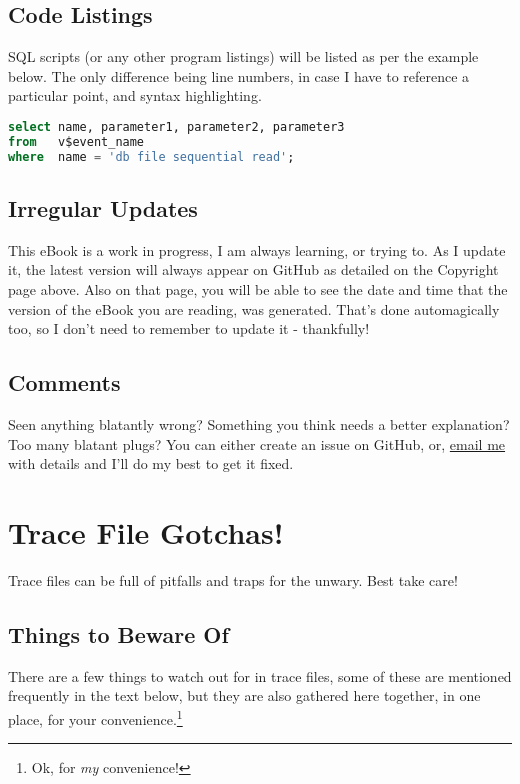 \section*{Code Listings}

SQL scripts (or any other program listings) will be listed as per the example below. The only difference being line numbers, in case I have to reference a particular point, and syntax highlighting.

\begin{lstlisting}[language=SQL]
select name, parameter1, parameter2, parameter3
from   v$event_name
where  name = 'db file sequential read';
\end{lstlisting}

\section*{Irregular Updates}

This eBook is a work in progress, I am always learning, or trying to. As I update it, the latest version will always appear on GitHub as detailed on the Copyright page above. Also on that page, you will be able to see the date and time that the version of the eBook you are reading, was generated. That's done automagically too, so I don't need to remember to update it - thankfully!

\section*{Comments}

Seen anything blatantly wrong? Something  you think needs a better explanation? Too many blatant plugs? You can either create an issue on GitHub, or, \href{mailto://norman@dunbar-it.co.uk}{email me} with details and I'll do my best to get it fixed.

\chapter{Trace File Gotchas!}\label{tracefilegotchas}

Trace files can be full of pitfalls and traps for the unwary. Best take care!

\section{Things to Beware Of}

There are a few things to watch out for in trace files, some of these are mentioned frequently in the text below, but they are also gathered here together, in one place, for your convenience.\footnote{Ok, for \emph{my} convenience!}
	

